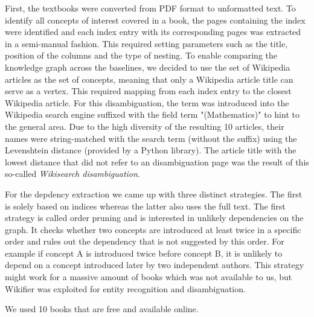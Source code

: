 \documentclass{article}
\begin{document}
First, the textbooks were converted from PDF format to unformatted text. To identify all concepts of interest covered in a book, the pages containing the index were identified and each index entry with its corresponding pages was extracted in a semi-manual fashion. This required setting parameters such as the title, position of the columns and the type of nesting. To enable comparing the knowledge graph across the baselines, we decided to use the set of Wikipedia articles as the set of concepts, meaning that only a Wikipedia article title can serve as a vertex. This required mapping from each index entry to the closest Wikipedia article. For this disambiguation, the term was introduced into the Wikipedia search engine suffixed with the field term "(Mathematics)" to hint to the general area. Due to the high diversity of the resulting 10 articles, their names were string-matched with the search term (without the suffix) using the Levenshtein distance (provided by a Python library). The article title with the lowest distance that did not refer to an disambiguation page was the result of this so-called \textit{Wikisearch disambiguation}.

For the depdency extraction we came up with three distinct strategies. The first is solely based on indices whereas the latter also uses the full text. The first strategy is called order pruning and is interested in unlikely dependencies on the graph. It checks whether two concepts are introduced at least twice in a specific order and rules out the dependency that is not suggested by this order. For example if concept A is introduced twice before concept B, it is unlikely to depend on a concept introduced later by two independent authors. This strategy might work for a massive amount of books which was not available to us, but Wikifier \citep{brank2017annotating} was exploited for entity recognition and disambiguation.





We used 10 books that are free and available online. 
\end{document}
